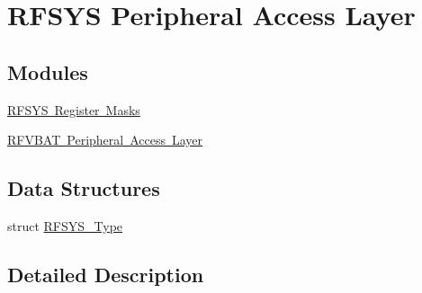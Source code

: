 \hypertarget{group___r_f_s_y_s___peripheral___access___layer}{}\section{R\+F\+S\+YS Peripheral Access Layer}
\label{group___r_f_s_y_s___peripheral___access___layer}
\subsection*{Modules}
\begin{DoxyCompactItemize}
\item 
\mbox{\hyperlink{group___r_f_s_y_s___register___masks}{R\+F\+S\+Y\+S Register Masks}}
\item 
\mbox{\hyperlink{group___r_f_v_b_a_t___peripheral___access___layer}{R\+F\+V\+B\+A\+T Peripheral Access Layer}}
\end{DoxyCompactItemize}
\subsection*{Data Structures}
\begin{DoxyCompactItemize}
\item 
struct \mbox{\hyperlink{struct_r_f_s_y_s___type}{R\+F\+S\+Y\+S\+\_\+\+Type}}
\end{DoxyCompactItemize}


\subsection{Detailed Description}
